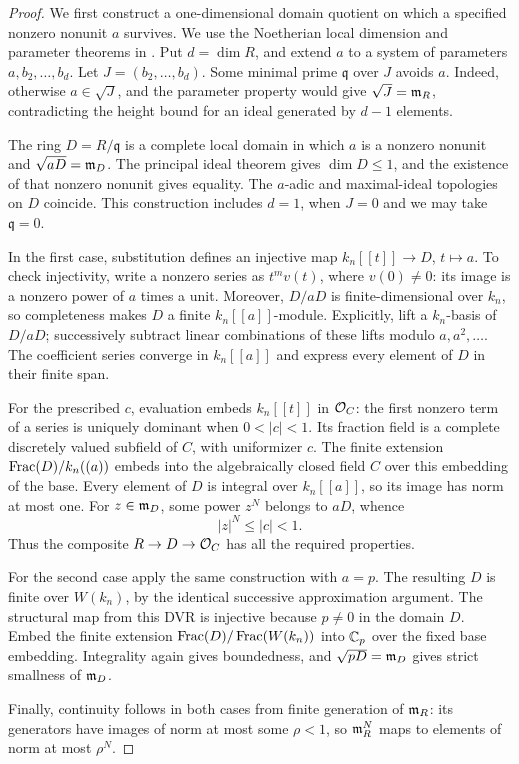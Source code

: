 \begin{proof}
We first construct a one-dimensional domain quotient on which a specified
nonzero nonunit \(a\) survives.  We use the Noetherian local dimension
and parameter theorems in \cite[Tags~00KQ and~00KD]{Stacks}.  Put \(d=\dim R\), and extend \(a\) to a
system of parameters \(a,b_2,\ldots,b_d\).  Let
\(J=(b_2,\ldots,b_d)\).  Some minimal prime \(\mathfrak q\) over \(J\)
avoids \(a\).  Indeed, otherwise \(a\in\sqrt J\), and the parameter
property would give \(\sqrt J=\mathfrak m_R\), contradicting the height bound
for an ideal generated by \(d-1\) elements.

The ring \(D=R/\mathfrak q\) is a complete local domain in which \(a\)
is a nonzero nonunit and \(\sqrt{aD}=\mathfrak m_D\).  The principal ideal
theorem gives \(\dim D\le1\), and the existence of that nonzero nonunit
gives equality.  The \(a\)-adic and maximal-ideal topologies on \(D\)
coincide.  This construction includes \(d=1\), when \(J=0\) and we may
take \(\mathfrak q=0\).

In the first case, substitution defines an injective map
\(k_n[[t]]\to D\), \(t\mapsto a\).  To check injectivity, write a nonzero
series as \(t^m v(t)\), where \(v(0)\ne0\): its image is a nonzero
power of \(a\) times a unit.  Moreover, \(D/aD\) is finite-dimensional
over \(k_n\), so completeness makes \(D\) a finite
\(k_n[[a]]\)-module.  Explicitly, lift a \(k_n\)-basis of \(D/aD\);
successively subtract linear combinations of these lifts modulo
\(a,a^2,\ldots\).  The coefficient series converge in \(k_n[[a]]\)
and express every element of \(D\) in their finite span.

For the prescribed \(c\), evaluation embeds \(k_n[[t]]\) in
\(\mathcal O_C\): the first nonzero term of a series is uniquely dominant
when \(0<|c|<1\).  Its fraction field is a complete discretely valued
subfield of \(C\), with uniformizer \(c\).  The finite extension
\(\operatorname{Frac}(D)/k_n((a))\) embeds into the algebraically closed field \(C\)
over this embedding of the base.  Every element of \(D\) is integral
over \(k_n[[a]]\), so its image has norm at most one.  For
\(z\in\mathfrak m_D\), some power \(z^N\) belongs to \(aD\), whence
\[
  |z|^N\le |c|<1.
\]
Thus the composite \(R\to D\to\mathcal O_C\) has all the required properties.

For the second case apply the same construction with \(a=p\).
The resulting \(D\) is finite over \(W(k_n)\), by the identical
successive approximation argument.  The structural map from this
DVR is injective because \(p\ne0\) in the domain \(D\).
Embed the finite extension
\(\operatorname{Frac}(D)/\operatorname{Frac}(W(k_n))\) into \(\mathbb C_p\) over the fixed base embedding.
Integrality again gives boundedness, and
\(\sqrt{pD}=\mathfrak m_D\) gives strict smallness of \(\mathfrak m_D\).

Finally, continuity follows in both cases from finite generation of
\(\mathfrak m_R\): its generators have images of norm at most some
\(\rho<1\), so \(\mathfrak m_R^N\) maps to elements of norm at most \(\rho^N\).
\end{proof}

